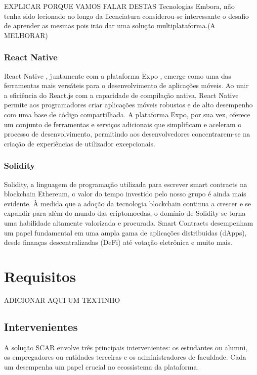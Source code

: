 \documentclass[10pt]{article}
\begin{document}
EXPLICAR PORQUE VAMOS FALAR DESTAS Tecnologias
Embora, não tenha sido lecionado ao longo da licenciatura considerou-se interessante o desafio de aprender
as mesmas pois irão dar uma solução multiplataforma.(A MELHORAR)

\subsubsection*{React Native}

React Native \cite{ReactNativeBook}, juntamente com a plataforma Expo \cite{Expo}, emerge como uma das ferramentas mais versáteis
para o desenvolvimento de aplicações móveis. Ao unir a eficiência do React.js com a capacidade de compilação
nativa, React Native permite aos programadores criar aplicações móveis robustos e de alto desempenho
com uma base de código compartilhada. A plataforma Expo, por sua vez, oferece um conjunto de ferramentas
e serviços adicionais que simplificam e aceleram o processo de desenvolvimento, permitindo aos desenvolvedores
concentrarem-se na criação de experiências de utilizador excepcionais.

\subsubsection*{Solidity}

Solidity, a linguagem de programação utilizada para escrever smart contracts na blockchain Ethereum,
o valor do tempo investido pelo nosso grupo é ainda mais evidente. À medida que a adoção da tecnologia
blockchain continua a crescer e se expandir para além do mundo das criptomoedas, o domínio de Solidity se
torna uma habilidade altamente valorizada e procurada. Smart Contracts desempenham um papel fundamental em
uma ampla gama de aplicações distribuidas (dApps), desde finanças descentralizadas (DeFi) até votação eletrônica
e muito mais.

\section{Requisitos}

ADICIONAR AQUI UM TEXTINHO

\subsection*{Intervenientes}

A solução SCAR envolve três principais intervenientes: os estudantes ou alumni, os empregadores ou entidades terceiras e os administradores
de faculdade. Cada um desempenha um papel crucial no ecossistema da plataforma.
\end{document}
